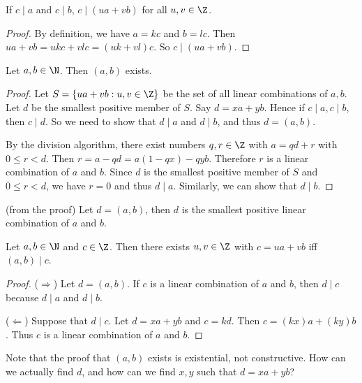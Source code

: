 \documentclass[a4paper]{article}
\begin{document}
\begin{prop}
  If $c\mid a$ and $c\mid b$, $c\mid (ua + vb)$ for all $u, v\in \Z$.
\end{prop}

\begin{proof}
  By definition, we have $a = kc$ and $b = lc$. Then $ua + vb = ukc + vlc = (uk + vl)c$. So $c\mid (ua + vb)$.
\end{proof}

\begin{thm}
  Let $a,b\in \N$. Then $(a, b)$ exists.
\end{thm}

\begin{proof}
  Let $S=\{ua + vb: u, v\in\Z\}$ be the set of all linear combinations of $a, b$. Let $d$ be the smallest positive member of $S$. Say $d = xa + yb$. Hence if $c\mid a, c\mid b$, then $c\mid d$. So we need to show that $d\mid a$ and $d\mid b$, and thus $d=(a, b)$.

  By the division algorithm, there exist numbers $q, r\in\Z$ with $a = qd + r$ with $0\leq r < d$. Then $r = a - qd = a(1 - qx) - qyb$. Therefore $r$ is a linear combination of $a$ and $b$. Since $d$ is the smallest positive member of $S$ and $0\leq r < d$, we have $r = 0$ and thus $d\mid a$. Similarly, we can show that $d\mid b$.
\end{proof}

\begin{cor}
  (from the proof) Let $d = (a, b)$, then $d$ is the smallest positive linear combination of $a$ and $b$.
\end{cor}

\begin{cor}
  Let $a, b\in\N$ and $c\in \Z$. Then there exists $u, v\in \Z$ with $c=ua + vb$ iff $(a, b)\mid c$.
\end{cor}

\begin{proof}
  ($\Rightarrow$) Let $d=(a, b)$. If $c$ is a linear combination of $a$ and $b$, then $d\mid c$ because $d\mid a$ and $d\mid b$.

  ($\Leftarrow$) Suppose that $d\mid c$. Let $d = xa + yb$ and $c = kd$. Then $c = (kx)a + (ky)b$. Thus $c$ is a linear combination of $a$ and $b$.
\end{proof}

Note that the proof that $(a, b)$ exists is existential, not constructive. How can we actually find $d$, and how can we find $x, y$ such that $d = xa + yb$?
\end{document}
